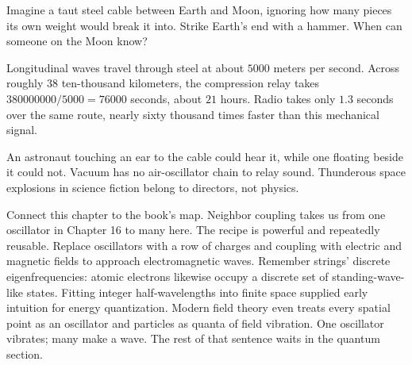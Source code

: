 \begin{thought}
Imagine a taut steel cable between Earth and Moon, ignoring how many pieces its own weight would break it into. Strike Earth's end with a hammer. When can someone on the Moon know?

Longitudinal waves travel through steel at about \(5000\) meters per second. Across roughly \(38\) ten-thousand kilometers, the compression relay takes \(380000000/5000 = 76000\) seconds, about \(21\) hours. Radio takes only \(1.3\) seconds over the same route, nearly sixty thousand times faster than this mechanical signal.

An astronaut touching an ear to the cable could hear it, while one floating beside it could not. Vacuum has no air-oscillator chain to relay sound. Thunderous space explosions in science fiction belong to directors, not physics.
\end{thought}

\begin{mainline}
Connect this chapter to the book's map. Neighbor coupling takes us from one oscillator in Chapter 16 to many here. The recipe is powerful and repeatedly reusable. Replace oscillators with a row of charges and coupling with electric and magnetic fields to approach electromagnetic waves. Remember strings' discrete eigenfrequencies: atomic electrons likewise occupy a discrete set of standing-wave-like states. Fitting integer half-wavelengths into finite space supplied early intuition for energy quantization. Modern field theory even treats every spatial point as an oscillator and particles as quanta of field vibration. One oscillator vibrates; many make a wave. The rest of that sentence waits in the quantum section.
\end{mainline}

